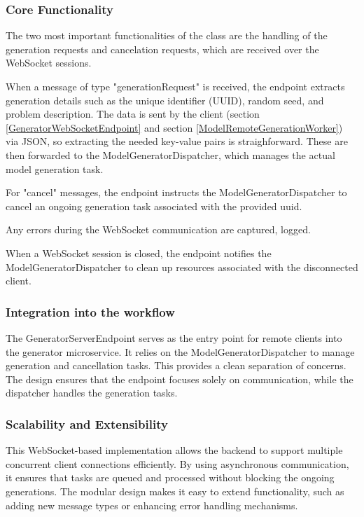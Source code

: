 			\subsubsection{Core Functionality} \label{Core Functionality}
				The two most important functionalities of the class are the handling of the generation requests and cancelation requests, which are
				 received over the 
				WebSocket sessions. 
				
				When a message of type "generationRequest" is received, the endpoint extracts generation details 
				such as the unique identifier (UUID), random seed, and problem description. The data is sent by the client (section \ref{GeneratorWebSocketEndpoint} 
				and section \ref{ModelRemoteGenerationWorker}) via JSON, so extracting the
				needed key-value pairs is straighforward. These are then forwarded to the ModelGeneratorDispatcher, 
				which manages the actual model generation task.

				\label{serverendpointcancel}For "cancel" messages, the endpoint instructs the ModelGeneratorDispatcher to cancel an ongoing generation task associated with the provided uuid.

				Any errors during the WebSocket communication are captured, logged.

				When a WebSocket session is closed, the endpoint notifies the ModelGeneratorDispatcher to clean up resources associated with the disconnected client.

			\subsubsection{Integration into the workflow} \label{Integration into the workflow}
				The GeneratorServerEndpoint serves as the entry point for remote clients into the generator microservice. 
				It relies on the ModelGeneratorDispatcher to manage generation and cancellation tasks. This provides a clean separation of concerns. 
				The design ensures that the endpoint focuses solely on communication, while the dispatcher handles the generation tasks.

			\subsubsection{Scalability and Extensibility} \label{Scalability and Extensibility}
				This WebSocket-based implementation allows the backend to support multiple concurrent client connections efficiently. 
				By using asynchronous communication, it ensures that tasks are queued and processed without blocking the ongoing generations. 
				The modular design makes it easy to extend functionality, such as adding new message types or enhancing error handling mechanisms.


